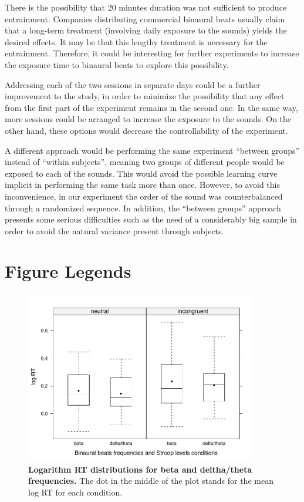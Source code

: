 \documentclass[10pt]{article}
\begin{document}
There is the possibility that 20 minutes duration was not sufficient to produce entrainment. Companies distributing commercial binaural beats usually claim that a long-term treatment (involving daily exposure to the sounds)  yields the desired effects. It may be that this lengthy treatment is necessary for the entrainment. Therefore, it could be interesting for further experiments to increase the exposure time to binaural beats to explore this possibility.

Addressing each of the two sessions in separate days could be a further improvement to the study, in order to minimize the possibility that any effect from the first part of the experiment remains in the second one. In the same way, more sessions could be arranged to increase the exposure to the sounds. On the other hand, these options would  decrease the controllability of the experiment.
 
A different approach would be performing the same experiment “between groups” instead of “within subjects”, meaning two groups of different people would be exposed to each of the sounds. This would avoid the possible learning curve implicit in performing the same task more than once. However, to avoid this inconvenience, in our experiment  the order of the sound was counterbalanced through a randomized sequence. In addition, the “between groups” approach presents some serious difficulties such as the need of a considerably big sample in order to avoid the natural variance present through subjects.






\section*{Figure Legends}

\begin{figure}[H]
\begin{center}
\includegraphics[width=4in]{logrt-eps-converted-to.pdf}
\end{center}
\caption{
{\bf Logarithm RT distributions for beta and deltha/theta frequencies.}
The dot in the middle of the plot stands for the mean log RT for each condition.
}
\label{figure_logrt}
\end{figure}
\end{document}
